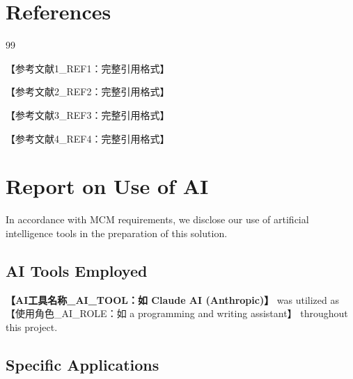 \documentclass{mcmthesis}
\begin{document}
\nobreak
\section{References}

\begin{thebibliography}{99}


 【参考文献1_REF1：完整引用格式】

 【参考文献2_REF2：完整引用格式】

 【参考文献3_REF3：完整引用格式】

 【参考文献4_REF4：完整引用格式】


\end{thebibliography}

\clearpage
\section*{Report on Use of AI}

In accordance with MCM requirements, we disclose our use of artificial intelligence tools in the preparation of this solution.

\subsection*{AI Tools Employed}

\textbf{【AI工具名称_AI_TOOL：如 Claude AI (Anthropic)】} was utilized as 【使用角色_AI_ROLE：如 a programming and writing assistant】 throughout this project.

\subsection*{Specific Applications}
\end{document}
